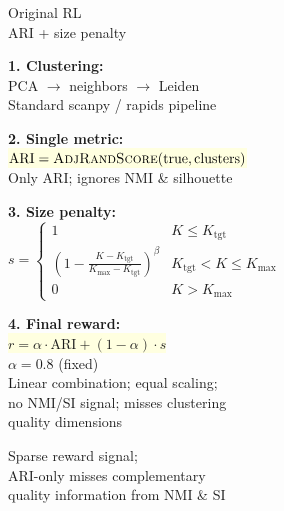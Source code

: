 \documentclass[8pt]{article}
\newlength{\colw}
\begin{document}
\noindent
\begin{minipage}[t]{\colw}
\begin{tcolorbox}[colback=hdrA, colframe=hdrA, fontupper=\bfseries\footnotesize\color{white},
    arc=2pt, left=2pt, right=2pt, top=1pt, bottom=1pt]
\centering Original RL\\[-2pt]
{\scriptsize\mdseries ARI + size penalty}
\end{tcolorbox}
\vspace{1pt}

\begin{warnbox}
\textbf{1. Clustering:}\\
PCA $\to$ neighbors $\to$ Leiden\\
{\scriptsize Standard scanpy / rapids pipeline}
\end{warnbox}\vspace{1pt}

\begin{warnbox}
\textbf{2. Single metric:}\\
\colorbox{lightyellow}{$\text{ARI} = \textsc{AdjRandScore}(\text{true}, \text{clusters})$}\\
{\scriptsize\color{removed} Only ARI; ignores NMI \& silhouette}
\end{warnbox}\vspace{1pt}

\begin{warnbox}
\textbf{3. Size penalty:}\\
{\small$s = \begin{cases} 1 & K \leq K_\text{tgt} \\ (1 - \frac{K-K_\text{tgt}}{K_\text{max}-K_\text{tgt}})^\beta & K_\text{tgt} {<} K {\leq} K_\text{max} \\ 0 & K > K_\text{max}\end{cases}$}
\end{warnbox}\vspace{1pt}

\begin{warnbox}
\textbf{4. Final reward:}\\
\colorbox{lightyellow}{$r = \alpha \cdot \text{ARI} + (1-\alpha) \cdot s$}\\
$\alpha = 0.8$ (fixed)\\
{\scriptsize\color{removed} Linear combination; equal scaling;\\
no NMI/SI signal; misses clustering\\
quality dimensions}
\end{warnbox}

\vspace{3pt}
\begin{center}
{\scriptsize\color{black!50} Sparse reward signal;\\
ARI-only misses complementary\\
quality information from NMI \& SI}
\end{center}
\end{minipage}%
\end{document}
